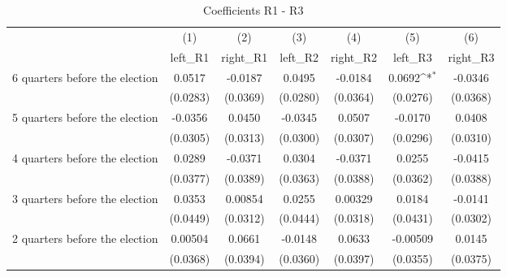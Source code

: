 \begin{table}[htbp]\centering
\def\sym#1{\ifmmode^{#1}\else\(^{#1}\)\fi}
\caption{Coefficients R1 - R3}
\begin{tabular}{l*{6}{c}}
\hline\hline
                    &\multicolumn{1}{c}{(1)}&\multicolumn{1}{c}{(2)}&\multicolumn{1}{c}{(3)}&\multicolumn{1}{c}{(4)}&\multicolumn{1}{c}{(5)}&\multicolumn{1}{c}{(6)}\\
                    &\multicolumn{1}{c}{left\_R1}&\multicolumn{1}{c}{right\_R1}&\multicolumn{1}{c}{left\_R2}&\multicolumn{1}{c}{right\_R2}&\multicolumn{1}{c}{left\_R3}&\multicolumn{1}{c}{right\_R3}\\
\hline
 6 quarters before the election&      0.0517         &     -0.0187         &      0.0495         &     -0.0184         &      0.0692\sym{*}  &     -0.0346         \\
                    &    (0.0283)         &    (0.0369)         &    (0.0280)         &    (0.0364)         &    (0.0276)         &    (0.0368)         \\
[1em]
 5 quarters before the election&     -0.0356         &      0.0450         &     -0.0345         &      0.0507         &     -0.0170         &      0.0408         \\
                    &    (0.0305)         &    (0.0313)         &    (0.0300)         &    (0.0307)         &    (0.0296)         &    (0.0310)         \\
[1em]
 4 quarters before the election&      0.0289         &     -0.0371         &      0.0304         &     -0.0371         &      0.0255         &     -0.0415         \\
                    &    (0.0377)         &    (0.0389)         &    (0.0363)         &    (0.0388)         &    (0.0362)         &    (0.0388)         \\
[1em]
 3 quarters before the election&      0.0353         &     0.00854         &      0.0255         &     0.00329         &      0.0184         &     -0.0141         \\
                    &    (0.0449)         &    (0.0312)         &    (0.0444)         &    (0.0318)         &    (0.0431)         &    (0.0302)         \\
[1em]
 2 quarters before the election&     0.00504         &      0.0661         &     -0.0148         &      0.0633         &    -0.00509         &      0.0145         \\
                    &    (0.0368)         &    (0.0394)         &    (0.0360)         &    (0.0397)         &    (0.0355)         &    (0.0375)         \\

\end{tabular}
\end{table}
